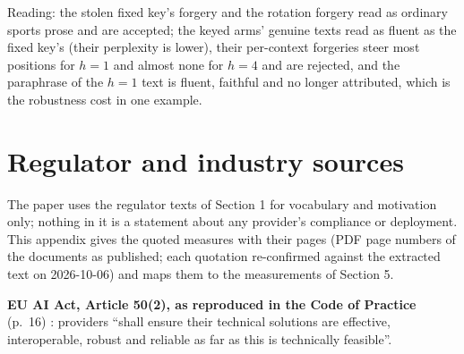 \documentclass[11pt,letterpaper]{article}
\begin{document}
Reading: the stolen fixed key's forgery and the rotation forgery read as ordinary sports prose and are accepted; the keyed arms' genuine texts read as fluent as the fixed key's (their perplexity is lower), their per-context forgeries steer most positions for \(h = 1\) and almost none for \(h = 4\) and are rejected, and the paraphrase of the \(h = 1\) text is fluent, faithful and no longer attributed, which is the robustness cost in one example.

\hypertarget{regulator-and-industry-sources}{%
\section{Regulator and industry sources}\label{regulator-and-industry-sources}}

The paper uses the regulator texts of Section 1 for vocabulary and motivation only; nothing in it is a statement about any provider's compliance or deployment. This appendix gives the quoted measures with their pages (PDF page numbers of the documents as published; each quotation re-confirmed against the extracted text on 2026-10-06) and maps them to the measurements of Section 5.

\textbf{EU AI Act, Article 50(2), as reproduced in the Code of Practice} (p.~16) \citep{ec2026codeofpractice}: providers ``shall ensure their technical solutions are effective, interoperable, robust and reliable as far as this is technically feasible''.
\end{document}
